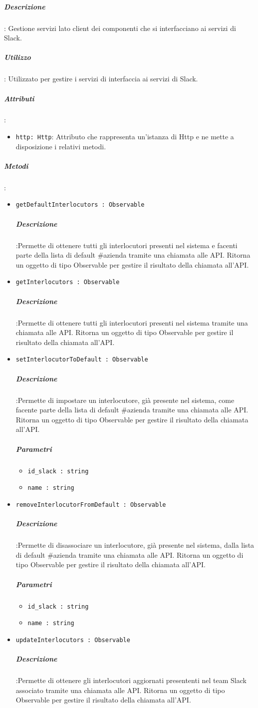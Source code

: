 \documentclass[../DefinizioneDiProdotto_v2.0.0.tex]{subfiles}
\begin{document}
				\subparagraph{Descrizione}: Gestione servizi lato client dei componenti che si interfacciano ai servizi di Slack.
				\subparagraph{Utilizzo}: Utilizzato per gestire i servizi di interfaccia ai servizi di Slack.
				\subparagraph{Attributi}:
				\begin{itemize}
					\item \texttt{http: Http}: Attributo che rappresenta un'istanza di Http e ne mette a disposizione i relativi metodi.
				\end{itemize}
				\subparagraph{Metodi}:
				\begin{itemize}
					\item \texttt{getDefaultInterlocutors : Observable}
					\subparagraph{Descrizione}:Permette di ottenere tutti gli interlocutori presenti nel sistema e facenti parte della lista di default \#azienda tramite una chiamata alle API. Ritorna un oggetto di tipo Observable per gestire il risultato della chiamata all'API.

					\item \texttt{getInterlocutors : Observable}
					\subparagraph{Descrizione}:Permette di ottenere tutti gli interlocutori presenti nel sistema tramite una chiamata alle API. Ritorna un oggetto di tipo Observable per gestire il risultato della chiamata all'API.

					\item \texttt{setInterlocutorToDefault : Observable}
					\subparagraph{Descrizione}:Permette di impostare un interlocutore, già presente nel sistema, come facente parte della lista di default \#azienda tramite una chiamata alle API. Ritorna un oggetto di tipo Observable per gestire il risultato della chiamata all'API.
						\subparagraph{Parametri}\begin{itemize}
							\item \texttt{id\_slack : string}
							\item \texttt{name : string}
						\end{itemize}
					\item \texttt{removeInterlocutorFromDefault : Observable}
					\subparagraph{Descrizione}:Permette di disassociare un interlocutore, già presente nel sistema, dalla lista di default \#azienda tramite una chiamata alle API. Ritorna un oggetto di tipo Observable per gestire il risultato della chiamata all'API.
						\subparagraph{Parametri}\begin{itemize}
							\item \texttt{id\_slack : string}
							\item \texttt{name : string}
						\end{itemize}
					\item \texttt{updateInterlocutors : Observable}
					\subparagraph{Descrizione}:Permette di ottenere gli interlocutori aggiornati presententi nel team Slack associato tramite una chiamata alle API. Ritorna un oggetto di tipo Observable per gestire il risultato della chiamata all'API.
				\end{itemize}
\end{document}
